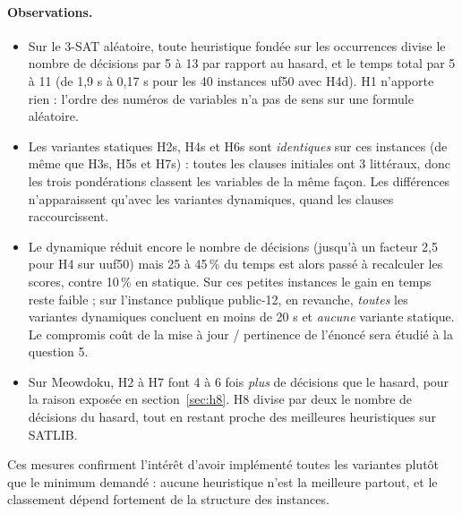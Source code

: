 \documentclass[11pt,a4paper]{article}
\begin{document}
\paragraph{Observations.}
\begin{itemize}
  \item Sur le 3-SAT aléatoire, toute heuristique fondée sur les
    occurrences divise le nombre de décisions par 5 à 13 par rapport au
    hasard, et le temps total par 5 à 11 (de 1,9 s à 0,17 s pour les 40
    instances uf50 avec H4d). H1 n'apporte rien : l'ordre des numéros de
    variables n'a pas de sens sur une formule aléatoire.
  \item Les variantes statiques H2s, H4s et H6s sont \emph{identiques} sur
    ces instances (de même que H3s, H5s et H7s) : toutes les clauses
    initiales ont 3 littéraux, donc les trois pondérations classent les
    variables de la même façon. Les différences n'apparaissent qu'avec les
    variantes dynamiques, quand les clauses raccourcissent.
  \item Le dynamique réduit encore le nombre de décisions (jusqu'à un
    facteur 2,5 pour H4 sur uuf50) mais 25 à 45\,\% du temps est alors
    passé à recalculer les scores, contre 10\,\% en statique. Sur ces petites
    instances le gain en temps reste faible ; sur l'instance publique
    public-12, en revanche, \emph{toutes} les variantes dynamiques
    concluent en moins de 20 s et \emph{aucune} variante statique.
    Le compromis \og coût de la mise à jour / pertinence \fg{} de l'énoncé
    sera étudié à la question 5.
  \item Sur Meowdoku, H2 à H7 font 4 à 6 fois \emph{plus} de décisions que
    le hasard, pour la raison exposée en section~\ref{sec:h8}. H8 divise
    par deux le nombre de décisions du hasard, tout en restant proche des
    meilleures heuristiques sur SATLIB.
\end{itemize}
Ces mesures confirment l'intérêt d'avoir implémenté toutes les variantes
plutôt que le minimum demandé : aucune heuristique n'est la meilleure
partout, et le classement dépend fortement de la structure des instances.
\end{document}
